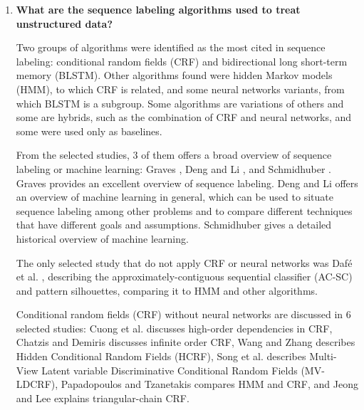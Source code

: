\begin{enumerate}[itemindent=\parindent,label=\textbf{RQ\arabic*.}]
\item   \textbf{What are the sequence labeling algorithms used to treat unstructured data?}

Two groups of algorithms were identified as the most cited in sequence labeling: conditional random fields (CRF) and bidirectional long short-term memory (BLSTM). 
Other algorithms found were hidden Markov models (HMM), to which CRF is related, and some neural networks variants, from which BLSTM is a subgroup. 
Some algorithms are variations of others and some are hybrids, such as the combination of CRF and neural networks, and some were used only as baselines.

From the selected studies,
3 of them offers a broad overview of sequence labeling or machine learning: Graves \cite{gravessupervised}, Deng and Li \cite{6423821}, and Schmidhuber \cite{Schmidhuber201585}.
    Graves \cite{gravessupervised} provides an excellent overview of sequence labeling.
    Deng and Li \cite{6423821} offers an overview of machine learning in general, which can be used to situate sequence labeling among other problems and to compare different techniques that have different goals and assumptions. 
    Schmidhuber \cite{Schmidhuber201585} gives a detailed historical overview of machine learning.

The only selected study that do not apply CRF or neural networks was Daf{\'e} et al. \cite{dafe2015learning}, describing the approximately-contiguous sequential classifier (AC-SC) and pattern silhouettes, comparing it to HMM and other algorithms.

    
Conditional random fields (CRF) without neural networks are discussed in 
6 selected studies:
    Cuong et al. \cite{Cuong:2014:CRF:2627435.2638567} discusses high-order dependencies in CRF,
    Chatzis and Demiris \cite{Chatzis20131523} discusses infinite order CRF,
    Wang and Zhang \cite{6213103} describes Hidden Conditional Random Fields (HCRF),
    Song et al. \cite{6247918} describes Multi-View Latent variable Discriminative Conditional Random Fields (MV-LDCRF),
    Papadopoulos and Tzanetakis \cite{7579173} compares HMM and CRF,
    and
    Jeong and Lee \cite{4599397} explains triangular-chain CRF.


\end{enumerate}
